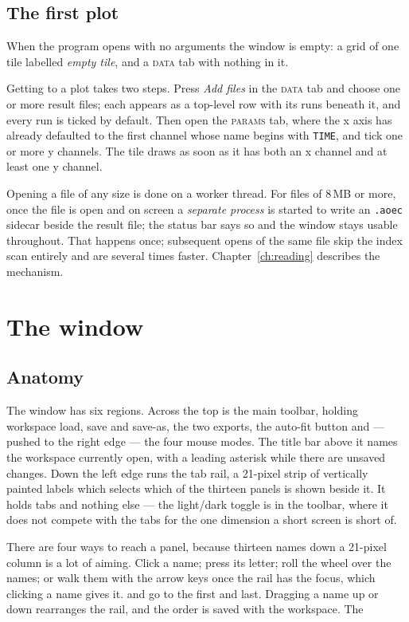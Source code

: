 \documentclass[11pt,a4paper,oneside]{report}
\newcommand{\code}[1]{\texttt{#1}}
\newcommand{\key}[1]{\textsf{\small\fbox{#1}}}
\newcommand{\tab}[1]{\textsc{#1}}
\begin{document}
\section{The first plot}

When the program opens with no arguments the window is empty: a grid of one tile
labelled \emph{empty tile}, and a \tab{data} tab with nothing in it.

Getting to a plot takes two steps. Press \emph{Add files} in the \tab{data} tab
and choose one or more result files; each appears as a top-level row with its
runs beneath it, and every run is ticked by default. Then open the \tab{params}
tab, where the x axis has already defaulted to the first channel whose name
begins with \code{TIME}, and tick one or more y channels. The tile draws as soon
as it has both an x channel and at least one y channel.

Opening a file of any size is done on a worker thread. For files of 8\,MB or
more, once the file is open and on screen a \emph{separate process} is started
to write an \code{.aoec} sidecar beside the result file; the status bar says so
and the window stays usable throughout. That happens once; subsequent opens of
the same file skip the index scan entirely and are several times faster.
Chapter~\ref{ch:reading} describes the mechanism.

\chapter{The window}

\section{Anatomy}

The window has six regions. Across the top is the main toolbar, holding
workspace load, save and save-as, the two exports, the auto-fit button and ---
pushed to the right edge --- the four mouse modes. The title bar above it names
the workspace currently open, with a leading asterisk while there are unsaved
changes. Down the left edge runs the tab rail, a 21-pixel strip of vertically
painted labels which selects which of the thirteen panels is shown beside it.
It holds tabs and nothing else --- the light/dark toggle is in the toolbar,
where it does not compete with the tabs for the one dimension a short screen is
short of.

There are four ways to reach a panel, because thirteen names down a 21-pixel
column is a lot of aiming. Click a name; press its letter; roll the wheel over
the names; or walk them with the arrow keys once the rail has the focus, which
clicking a name gives it. \key{Home} and \key{End} go to the first and last.
Dragging a name up or down rearranges the rail, and the order is saved with the
workspace. The
\end{document}
